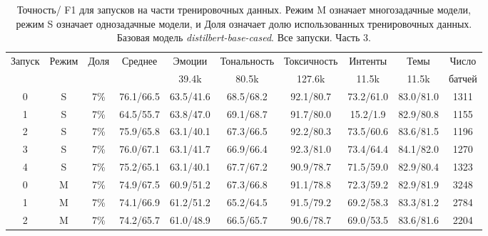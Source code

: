 \begin{table*}
\caption{Точность/ F1 для запусков на части тренировочных данных.  Режим M означает многозадачные модели, режим S означает однозадачные модели, и Доля означает долю использованных тренировочных данных. Базовая модель \textit{distilbert-base-cased}. Все запуски. Часть 3. }%
\label{appendix:model_results2}
\begin{tabular}{|c|c|c||c|c|c|c|c|c||c|} \hline
 \multirow{2}{*}{Запуск} & \multirow{2}{*}{Режим} &  \multirow{2}{*}{Доля} &\multirow{2}{*}{Среднее} & Эмоции & Тональность & Токсичность & Интенты & Темы & Число \\
& & & & 39.4k & 80.5k & 127.6k & 11.5k & 11.5k & батчей \\ \hline \hline
0 & S & 7\% & 76.1/66.5 & 63.5/41.6 & 68.5/68.2 & 92.1/80.7 & 73.2/61.0 & 83.0/81.0 & 1311 \\ \hline
1 & S & 7\% & 64.5/55.7 & 63.8/47.0 & 69.1/68.7 & 91.7/80.0 & 15.2/1.9 & 82.9/80.8 & 1155 \\ \hline
2 & S & 7\% & 75.9/65.8 & 63.1/40.1 & 67.3/66.5 & 92.2/80.3 & 73.5/60.6 & 83.6/81.5 & 1196 \\ \hline
3 & S & 7\% & 76.0/67.1 & 63.1/41.7 & 66.9/66.4 & 92.3/81.0 & 73.4/64.4 & 84.1/82.0 & 1270 \\ \hline
4 & S & 7\% & 75.2/65.1 & 63.1/40.1 & 67.7/67.2 & 90.9/78.7 & 71.5/59.0 & 82.9/80.4 & 1323 \\ \hline
0 & M & 7\% & 74.9/67.5 & 60.9/51.2 & 67.3/66.8 & 91.1/78.8 & 72.3/59.2 & 82.9/81.9 & 3248 \\ \hline
1 & M & 7\% & 74.1/66.9 & 61.2/51.2 & 65.2/64.5 & 91.5/79.2 & 69.2/58.3 & 83.3/81.2 & 2784 \\ \hline
2 & M & 7\% & 74.2/65.7 & 61.0/48.9 & 66.5/65.7 & 90.6/78.7 & 69.0/53.5 & 83.6/81.6 & 2204 \\ \hline

\end{tabular}
\end{table*}
